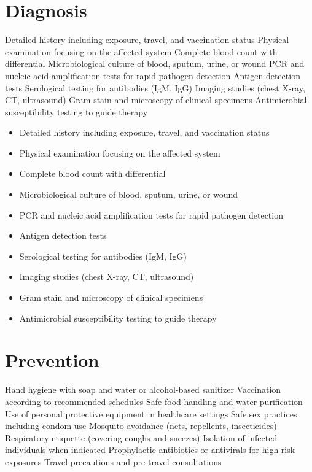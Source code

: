 \section{Diagnosis}
Detailed history including exposure, travel, and vaccination status Physical examination focusing on the affected system Complete blood count with differential Microbiological culture of blood, sputum, urine, or wound PCR and nucleic acid amplification tests for rapid pathogen detection Antigen detection tests Serological testing for antibodies (IgM, IgG) Imaging studies (chest X-ray, CT, ultrasound) Gram stain and microscopy of clinical specimens Antimicrobial susceptibility testing to guide therapy

\begin{itemize}[noitemsep]
  \item Detailed history including exposure, travel, and vaccination status
  \item Physical examination focusing on the affected system
  \item Complete blood count with differential
  \item Microbiological culture of blood, sputum, urine, or wound
  \item PCR and nucleic acid amplification tests for rapid pathogen detection
  \item Antigen detection tests
  \item Serological testing for antibodies (IgM, IgG)
  \item Imaging studies (chest X-ray, CT, ultrasound)
  \item Gram stain and microscopy of clinical specimens
  \item Antimicrobial susceptibility testing to guide therapy
\end{itemize}
\section{Prevention}
Hand hygiene with soap and water or alcohol-based sanitizer Vaccination according to recommended schedules Safe food handling and water purification Use of personal protective equipment in healthcare settings Safe sex practices including condom use Mosquito avoidance (nets, repellents, insecticides) Respiratory etiquette (covering coughs and sneezes) Isolation of infected individuals when indicated Prophylactic antibiotics or antivirals for high-risk exposures Travel precautions and pre-travel consultations

